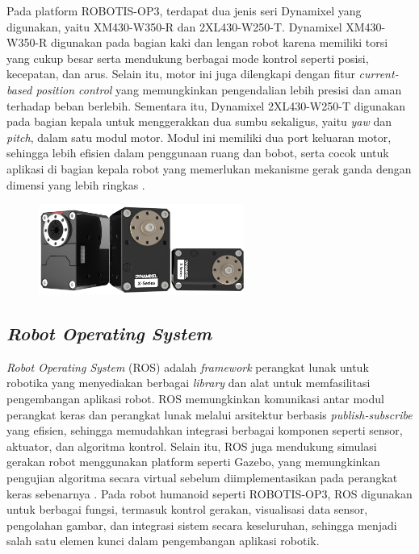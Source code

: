 Pada platform ROBOTIS-OP3, terdapat dua jenis seri Dynamixel yang digunakan, yaitu XM430-W350-R dan 2XL430-W250-T. Dynamixel XM430-W350-R digunakan pada bagian kaki dan lengan robot karena memiliki torsi yang cukup besar serta mendukung berbagai mode kontrol seperti posisi, kecepatan, dan arus. Selain itu, motor ini juga dilengkapi dengan fitur \textit{current-based position control} yang memungkinkan pengendalian lebih presisi dan aman terhadap beban berlebih. Sementara itu, Dynamixel 2XL430-W250-T digunakan pada bagian kepala untuk menggerakkan dua sumbu sekaligus, yaitu \textit{yaw} dan \textit{pitch}, dalam satu modul motor. Modul ini memiliki dua port keluaran motor, sehingga lebih efisien dalam penggunaan ruang dan bobot, serta cocok untuk aplikasi di bagian kepala robot yang memerlukan mekanisme gerak ganda dengan dimensi yang lebih ringkas \cite{robotis_op3}.

\begin{figure}[H]
    \centering
    \includegraphics[width=0.6\textwidth]{images/dynamixel.png}
    \label{fig:dynamixel}
\end{figure}


\subsection{\textit{Robot Operating System}}
\textit{Robot Operating System} (ROS) adalah \textit{framework} perangkat lunak untuk robotika yang menyediakan berbagai \textit{library} dan alat untuk memfasilitasi pengembangan aplikasi robot. ROS memungkinkan komunikasi antar modul perangkat keras dan perangkat lunak melalui arsitektur berbasis \textit{publish-subscribe} yang efisien, sehingga memudahkan integrasi berbagai komponen seperti sensor, aktuator, dan algoritma kontrol. Selain itu, ROS juga mendukung simulasi gerakan robot menggunakan platform seperti Gazebo, yang memungkinkan pengujian algoritma secara virtual sebelum diimplementasikan pada perangkat keras sebenarnya \cite{sa2024pengembangan}. Pada robot humanoid seperti ROBOTIS-OP3, ROS digunakan untuk berbagai fungsi, termasuk kontrol gerakan, visualisasi data sensor, pengolahan gambar, dan integrasi sistem secara keseluruhan, sehingga menjadi salah satu elemen kunci dalam pengembangan aplikasi robotik.

